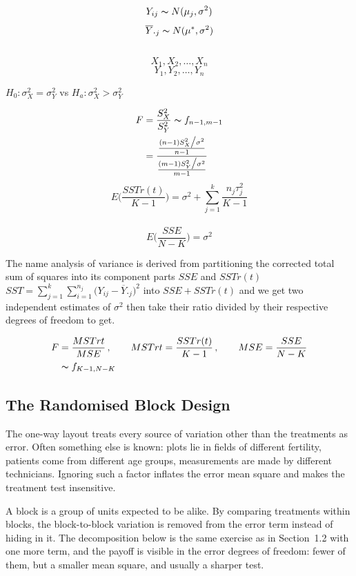 \documentclass[11pt,a4paper]{article}
\theoremstyle{definition}
\begin{document}
$$Y_{ij}\thicksim N(\mu_j,\sigma^2)$$
$$\overline{Y}._j \thicksim N(\mu^*,\sigma^2)$$\\


$$X_1,X_2,\ldots , X_n$$
$$Y_1,Y_2,\ldots , Y_n$$

$H_0:\sigma_X^2=\sigma^2_Y$ vs $H_a:\sigma^2_X>\sigma^2_Y$ 


\begin{align*}
F & = \frac{S^2_X}{S^2_Y}\thicksim f_{n-1,m-1}\\
& = \frac{\frac{(n-1)S_X^2\big/\sigma^2}{n-1}}{\frac{(m-1)S^2_Y\big/\sigma^2}{m-1}}\\
\end{align*}
$$E\Bigg(\frac{SSTr(t)}{K-1}\Bigg)=\sigma^2+\sum^k_{j=1}\frac{n_j \tau_j^2}{K-1}$$\\


$$E\Bigg(\frac{SSE}{N-K}\Bigg) = \sigma^2$$

The name analysis of variance is derived from partitioning the corrected total sum of squares into its component parts $SSE$ and $SSTr(t)\qquad $ $SST= \displaystyle{\sum^k_{j=1}\sum^{n_j}_{i=1}\big(Y_{ij}-\overline{Y}._j\big)^2}$ into $SSE + SSTr(t)$ and we get two independent estimates of $\sigma^2$ then take their ratio divided by their respective degrees of freedom to get.  


\begin{align*}
F & = \frac{MSTrt}{MSE}\,,\qquad  MSTrt = \frac{SSTr(t)}{K-1}\,,\qquad  MSE = \frac{SSE}{N-K}\\
  & \thicksim f_{K-1,N-K}\\
\end{align*}


\subsection{The Randomised Block Design}
The one-way layout treats every source of variation other than the treatments
as error. Often something else is known: plots lie in fields of different
fertility, patients come from different age groups, measurements are made by
different technicians. Ignoring such a factor inflates the error mean square
and makes the treatment test insensitive.

A block is a group of units expected to be alike. By comparing treatments
within blocks, the block-to-block variation is removed from the error term
instead of hiding in it. The decomposition below is the same exercise as in
Section~1.2 with one more term, and the payoff is visible in the error degrees
of freedom: fewer of them, but a smaller mean square, and usually a sharper
test.
\end{document}
